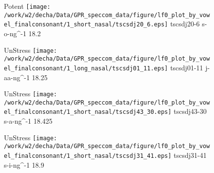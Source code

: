 \documentclass{article}
\begin{document}
\begin{figure}[t]
\begin{minipage}[b]{.24\textwidth}
\colorbox{Apricot}{Potent}
\centering
\texttt{[image: /work/w2/decha/Data/GPR\_speccom\_data/figure/lf0\_plot\_by\_vowel\_finalconsonant/1\_short\_nasal/tscsdj20\_6.eps]}
tscsdj20-6 s-o-ng\textasciicircum-1 18.2
\end{minipage}
\begin{minipage}[b]{.24\textwidth}
UnStress
\centering
\texttt{[image: /work/w2/decha/Data/GPR\_speccom\_data/figure/lf0\_plot\_by\_vowel\_finalconsonant/1\_long\_nasal/tscsdj01\_11.eps]}
tscsdj01-11 j-aa-ng\textasciicircum-1 18.25
\end{minipage}
\begin{minipage}[b]{.24\textwidth}
UnStress
\centering
\texttt{[image: /work/w2/decha/Data/GPR\_speccom\_data/figure/lf0\_plot\_by\_vowel\_finalconsonant/1\_short\_nasal/tscsdj43\_30.eps]}
tscsdj43-30 s-a-ng\textasciicircum-1 18.425
\end{minipage}
\begin{minipage}[b]{.24\textwidth}
UnStress
\centering
\texttt{[image: /work/w2/decha/Data/GPR\_speccom\_data/figure/lf0\_plot\_by\_vowel\_finalconsonant/1\_short\_nasal/tscsdj31\_41.eps]}
tscsdj31-41 s-i-ng\textasciicircum-1 18.9
\end{minipage}
\end{figure}
\end{document}

